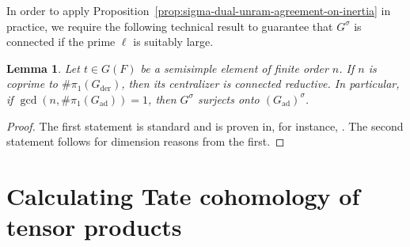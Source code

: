 \documentclass[reqno]{amsart}
\numberwithin{equation}{subsection}
\newcommand{\ol}[1]{\overline{#1}}
\newcommand{\co}{\colon}
\DeclareMathOperator{\ad}{ad}
\DeclareMathOperator{\der}{der}
\newtheorem{lemma}[thm]{Lemma}
\theoremstyle{remark}
\numberwithin{equation}{subsection}
\numberwithin{figure}{subsection}
\begin{document}
In order to apply Proposition~\ref{prop:sigma-dual-unram-agreement-on-inertia} in practice, we require the following technical result to guarantee that $G^\sigma$ is connected if the prime $\ell$ is suitably large.

\begin{lemma}\label{lem:centralizer-connected}
Let $t \in G(F)$ be a semisimple element of finite order $n$. If $n$ is coprime to $\#\pi_1(G_{\der})$, then its centralizer is connected reductive. In particular, if $\gcd(n, \#\pi_1(G_{\ad})) = 1$, then $G^\sigma$ surjects onto $(G_{\ad})^\sigma$.
\end{lemma}

\begin{proof}
The first statement is standard and is proven in, for instance, \cite[Lemma 2.14(b), Corollary 2.16(c)]{St75}. The second statement follows for dimension reasons from the first.
\end{proof}





\section{Calculating Tate cohomology of tensor products}\label{section:tate-tensor-products}
\end{document}
